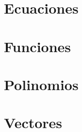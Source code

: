\documentclass[12pt]{article}
\begin{document}
\tableofcontents





\section{Ecuaciones}





\section{Funciones}




\section{Polinomios}




\section{Vectores}

\end{document}
